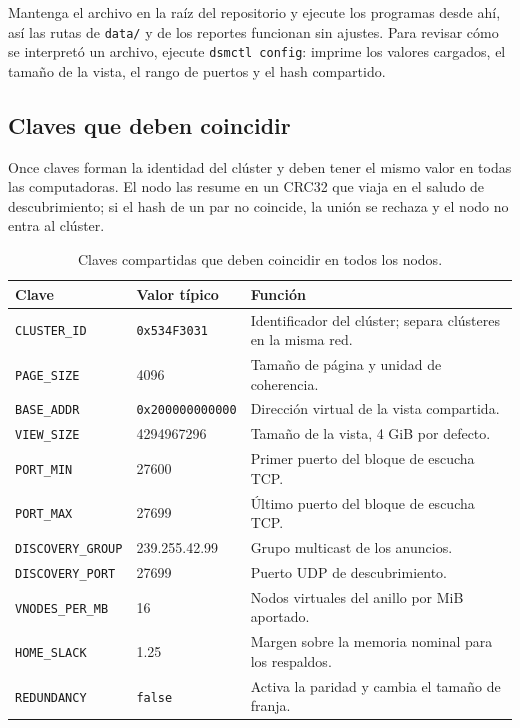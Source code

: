 Mantenga el archivo en la raíz del repositorio y ejecute los programas desde ahí, así las rutas de \texttt{data/} y de los reportes funcionan sin ajustes. Para revisar cómo se interpretó un archivo, ejecute \texttt{dsmctl config}: imprime los valores cargados, el tamaño de la vista, el rango de puertos y el hash compartido.

\subsection{Claves que deben coincidir}\label{subsec:claves-compartidas}

Once claves forman la identidad del clúster y deben tener el mismo valor en todas las computadoras. El nodo las resume en un CRC32 que viaja en el saludo de descubrimiento; si el hash de un par no coincide, la unión se rechaza y el nodo no entra al clúster.

\begin{table}[H]
\centering
\small
\caption{Claves compartidas que deben coincidir en todos los nodos.}
\label{tab:claves-compartidas}
\begin{tabularx}{\textwidth}{@{}P{4.1cm} P{2.6cm} Y@{}}
\toprule
Clave & Valor típico & Función \\
\midrule
\texttt{CLUSTER\_ID} & \texttt{0x534F3031} & Identificador del clúster; separa clústeres en la misma red. \\
\texttt{PAGE\_SIZE} & 4096 & Tamaño de página y unidad de coherencia. \\
\texttt{BASE\_ADDR} & \texttt{0x200000000000} & Dirección virtual de la vista compartida. \\
\texttt{VIEW\_SIZE} & 4294967296 & Tamaño de la vista, 4 GiB por defecto. \\
\texttt{PORT\_MIN} & 27600 & Primer puerto del bloque de escucha TCP. \\
\texttt{PORT\_MAX} & 27699 & Último puerto del bloque de escucha TCP. \\
\texttt{DISCOVERY\_GROUP} & 239.255.42.99 & Grupo multicast de los anuncios. \\
\texttt{DISCOVERY\_PORT} & 27699 & Puerto UDP de descubrimiento. \\
\texttt{VNODES\_PER\_MB} & 16 & Nodos virtuales del anillo por MiB aportado. \\
\texttt{HOME\_SLACK} & 1.25 & Margen sobre la memoria nominal para los respaldos. \\
\texttt{REDUNDANCY} & \texttt{false} & Activa la paridad y cambia el tamaño de franja. \\
\bottomrule
\end{tabularx}
\end{table}

